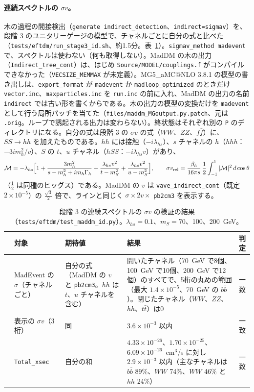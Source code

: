 \documentclass[a4paper,10pt]{ltjsarticle}
\makeatletter
\newcommand{\MGaMC}{MG5\_aMC@NLO}
\makeatother
\begin{document}
\paragraph{連続スペクトルの $\sigma v$。}木の過程の間接検出（\texttt{generate indirect\_detection}、\texttt{indirect=sigmav}）を、段階 3 のユニタリーゲージの模型で、チャネルごとに自分の式と比べた（\nolinkurl{tests/eftdm/run_stage3_id.sh}、約1.5分。表~\ref{tab:eftdm3id}）。\texttt{sigmav\_method madevent} で、スペクトルは使わない（何も取得しない）。MadDM の木の出力（\texttt{Indirect\_tree\_cont}）は、はじめ \texttt{Source/MODEL/couplings.f} がコンパイルできなかった（\texttt{VECSIZE\_MEMMAX} が未定義）。\MGaMC{} 3.8.1 の模型の書き出しは、\texttt{export\_format} が \texttt{madevent} か \texttt{madloop\_optimized} のときだけ \texttt{vector.inc}、\texttt{maxparticles.inc} を \texttt{run.inc} の前に入れ、MadDM の出力の名前 \texttt{indirect} では古い形を書くからである。木の出力の模型の変換だけを \texttt{madevent} として行う局所パッチを当てた（\nolinkurl{files/maddm_MGoutput.py.patch}、元は \texttt{.orig}。ループで誘起される出力は変わらない）。終状態はそれぞれ別の \texttt{P} のディレクトリになる。自分の式は段階 3 の $\sigma v$ の式（$WW$、$ZZ$、$f\bar f$）に、$SS\to hh$ を加えたものである。$hh$ には接触（$-i\lambda_{hs}$）、$s$ チャネルの $h$（$hhh$：$-3im_h^2/v$）、$S$ の $t$、$u$ チャネル（$hSS$：$-i\lambda_{hs}v$）があり、
\[
\mathcal M=-\lambda_{hs}\Bigl[1+\frac{3m_h^2}{s-m_h^2+im_h\Gamma_h}+\frac{\lambda_{hs}v^2}{t-m_S^2}+\frac{\lambda_{hs}v^2}{u-m_S^2}\Bigr],\qquad
\sigma v_{\mathrm{rel}}=\frac{\beta_h}{16\pi s}\,\frac12\int_{-1}^1|\mathcal M|^2\,d\cos\theta
\]
（$\frac12$ は同種のヒッグス）である。MadDM の $v$ は \texttt{vave\_indirect\_cont}（既定 $2\times10^{-5}$）の $\frac{\sqrt3}2$ 倍で、ラインと同じく $\sigma\times2v\times$ \texttt{pb2cm3} を表示する。

\begin{table}[htbp]
\centering\small
\caption{段階 3 の連続スペクトルの $\sigma v$ の検証の結果（\nolinkurl{tests/eftdm/test_maddm_id.py}）。$\lambda_{hs}=0.1$、$m_S=70$、100、200~GeV。}
\label{tab:eftdm3id}
\begin{tabularx}{\linewidth}{>{\raggedright\arraybackslash}p{0.35cm}>{\raggedright\arraybackslash}p{3.0cm}>{\raggedright\arraybackslash}X>{\raggedright\arraybackslash}X>{\raggedright\arraybackslash}p{1.9cm}}
\toprule
& \textbf{対象} & \textbf{期待値} & \textbf{結果} & \textbf{判定} \\
\midrule
1 & MadEvent の $\sigma$（チャネルごと） & 自分の式（MadDM の $v$ と \texttt{pb2cm3}。$hh$ は $t$、$u$ チャネルを含む） & 開いたチャネル（70~GeV で8個、100~GeV で10個、200~GeV で12個）のすべてで、5桁の丸めの範囲（最大 $1.4\times10^{-5}$、70~GeV の $b\bar b$）。閉じたチャネル（$WW$、$ZZ$、$hh$、$t\bar t$）は0 & 一致 \\
2 & 表示の $\sigma v$（3桁） & 同 & $3.6\times10^{-3}$ 以内 & 一致 \\
3 & \texttt{Total\_xsec} & 自分の和 & $4.33\times10^{-26}$、$1.70\times10^{-25}$、$6.09\times10^{-26}$~cm$^3$/s に対し $2.9\times10^{-3}$ 以内（主なチャネルは $b\bar b$ 89\%、$WW$ 74\%、$WW$ 46\% と $hh$ 24\%） & 一致 \\
\bottomrule
\end{tabularx}
\end{table}
\end{document}
